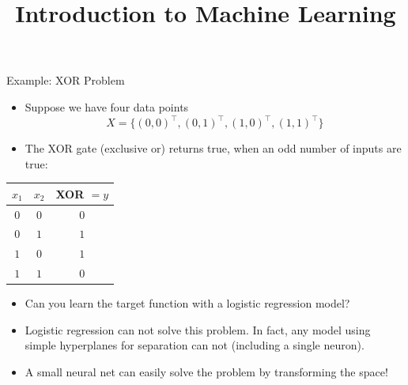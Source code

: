 \documentclass[11pt,compress,t,notes=noshow, xcolor=table]{beamer}
\title{Introduction to Machine Learning}
\date{}
\begin{document}


\begin{vbframe}{Example: XOR Problem}
  \begin{itemize}
    \item Suppose we have four data points $$X = \{(0,0)^\top, (0,1)^\top, (1,0)^\top, (1,1)^\top \}$$
    \item The XOR gate (exclusive or) returns true, when an odd number of inputs are true:
  \end{itemize}
  \begin{table}
    \centering
      \begin{tabular}{ccc}
        \textbf{$x_1$}  & \textbf{$x_2$}  & \textbf{XOR} $= y$ \\
        \hline
        \hline
        $0$             &   $0$           &  $0$ \\
        $0$             &   $1$           &  $1$ \\
        $1$             &   $0$           &  $1$ \\
        $1$             &   $1$           &  $0$
      \end{tabular}
  \end{table}
  \begin{itemize}
    \item Can you learn the target function with a logistic regression model? \\
  \end{itemize}
\framebreak
  \begin{minipage}{0.45\textwidth}
    \begin{itemize}
      \item Logistic regression can not solve this problem. %
      In fact, any model using simple hyperplanes for separation can not (including a single neuron).
      \lz
      \item A small neural net can easily solve the problem by transforming the space!

\end{itemize}
\end{minipage}
\end{vbframe}
\end{document}
